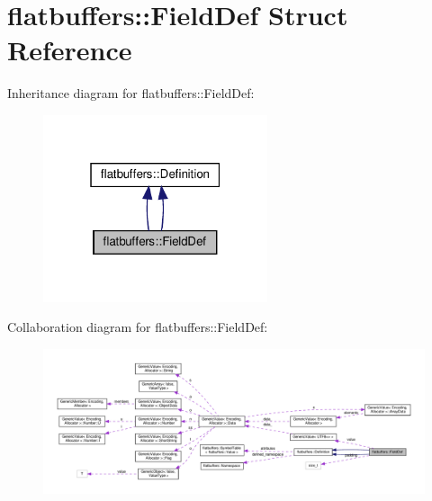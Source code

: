\hypertarget{structflatbuffers_1_1FieldDef}{}\section{flatbuffers\+:\+:Field\+Def Struct Reference}
\label{structflatbuffers_1_1FieldDef}


Inheritance diagram for flatbuffers\+:\+:Field\+Def\+:
\nopagebreak
\begin{figure}[H]
\begin{center}
\leavevmode
\includegraphics[width=187pt]{structflatbuffers_1_1FieldDef__inherit__graph}
\end{center}
\end{figure}


Collaboration diagram for flatbuffers\+:\+:Field\+Def\+:
\nopagebreak
\begin{figure}[H]
\begin{center}
\leavevmode
\includegraphics[width=350pt]{structflatbuffers_1_1FieldDef__coll__graph}
\end{center}
\end{figure}
